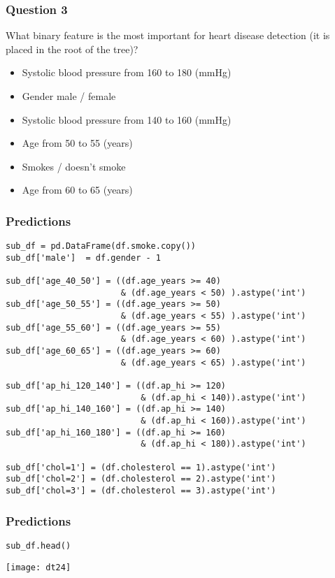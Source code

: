 \begin{frame}[fragile]\frametitle{Question 3}
What binary feature is the most important for heart disease detection (it is placed in the root of the tree)?

\begin{itemize}
\item Systolic blood pressure from 160 to 180 (mmHg)
\item Gender male / female
\item Systolic blood pressure from 140 to 160 (mmHg) 
\item Age from 50 to 55 (years)
\item Smokes / doesn't smoke
\item Age from 60 to 65 (years)
\end{itemize}
\end{frame}

\begin{frame}[fragile]\frametitle{Predictions}
\begin{lstlisting}
sub_df = pd.DataFrame(df.smoke.copy())
sub_df['male']  = df.gender - 1

sub_df['age_40_50'] = ((df.age_years >= 40) 
                       & (df.age_years < 50) ).astype('int')
sub_df['age_50_55'] = ((df.age_years >= 50) 
                       & (df.age_years < 55) ).astype('int')
sub_df['age_55_60'] = ((df.age_years >= 55) 
                       & (df.age_years < 60) ).astype('int')
sub_df['age_60_65'] = ((df.age_years >= 60) 
                       & (df.age_years < 65) ).astype('int')

sub_df['ap_hi_120_140'] = ((df.ap_hi >= 120) 
                           & (df.ap_hi < 140)).astype('int')
sub_df['ap_hi_140_160'] = ((df.ap_hi >= 140) 
                           & (df.ap_hi < 160)).astype('int')
sub_df['ap_hi_160_180'] = ((df.ap_hi >= 160) 
                           & (df.ap_hi < 180)).astype('int')

sub_df['chol=1'] = (df.cholesterol == 1).astype('int')
sub_df['chol=2'] = (df.cholesterol == 2).astype('int')
sub_df['chol=3'] = (df.cholesterol == 3).astype('int')
\end{lstlisting}
\end{frame}

\begin{frame}[fragile]\frametitle{Predictions}
\begin{lstlisting}
sub_df.head()
\end{lstlisting}
\begin{center}
\texttt{[image: dt24]}
\end{center}
\end{frame}


